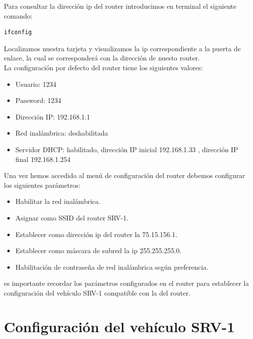 Para consultar la dirección ip del router introducimos en terminal el siguiente comando:\\

\begin{lstlisting}[style=consola]
ifconfig
\end{lstlisting} 

Localizamos nuestra tarjeta y visualizamos la ip correspondiente a la puerta de enlace, la cual se corresponderá con la dirección de nuesto router.\\

La configuración por defecto del router tiene los siguientes valores: 

\begin{itemize}
\item Usuario: 1234 
\item Password: 1234 
\item Dirección IP: 192.168.1.1 
\item Red inalámbrica: deshabilitada 
\item Servidor DHCP: habilitado, dirección IP inicial 192.168.1.33 , dirección IP final 192.168.1.254 
\end{itemize}

Una vez hemos accedido al menú de configuración del router debemos configurar los siguientes parámetros:

\begin{itemize}
\item Habilitar la red inalámbrica.
\item Asignar como SSID del router SRV-1.
\item Establecer como dirección ip del router la 75.15.156.1.
\item Establecer como máscara de subred la ip 255.255.255.0.
\item Habilitación de contraseña de red inalámbrica según preferencia.
\end{itemize}

\begin{fondo}
  \begin{nota}
    es importante recordar los parámetros configurados en el router para establecer la configuración del vehículo SRV-1 compatible con la del router. 
  \end{nota}
\end{fondo}

\section{Configuración del vehículo SRV-1}
\label{sec:configuración-srv}

